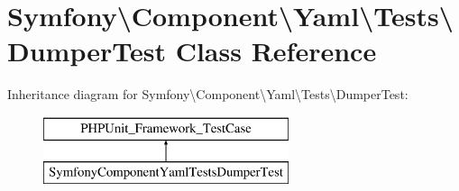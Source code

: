 \hypertarget{classSymfony_1_1Component_1_1Yaml_1_1Tests_1_1DumperTest}{}\section{Symfony\textbackslash{}Component\textbackslash{}Yaml\textbackslash{}Tests\textbackslash{}Dumper\+Test Class Reference}
\label{classSymfony_1_1Component_1_1Yaml_1_1Tests_1_1DumperTest}
Inheritance diagram for Symfony\textbackslash{}Component\textbackslash{}Yaml\textbackslash{}Tests\textbackslash{}Dumper\+Test\+:\begin{figure}[H]
\begin{center}
\leavevmode
\includegraphics[height=2.000000cm]{classSymfony_1_1Component_1_1Yaml_1_1Tests_1_1DumperTest}
\end{center}
\end{figure}
